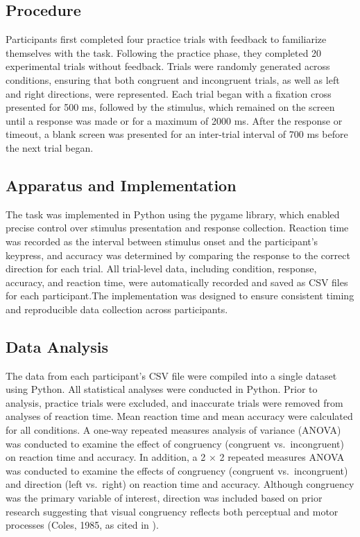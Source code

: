 \documentclass[
  authoryear,
  preprint]{elsarticle}
\begin{document}
\subsection{Procedure}\label{procedure}

Participants first completed four practice trials with feedback to
familiarize themselves with the task. Following the practice phase, they
completed 20 experimental trials without feedback. Trials were randomly
generated across conditions, ensuring that both congruent and
incongruent trials, as well as left and right directions, were
represented. Each trial began with a fixation cross presented for 500
ms, followed by the stimulus, which remained on the screen until a
response was made or for a maximum of 2000 ms. After the response or
timeout, a blank screen was presented for an inter-trial interval of 700
ms before the next trial began.

\subsection{Apparatus and
Implementation}\label{apparatus-and-implementation}

The task was implemented in Python using the pygame library, which
enabled precise control over stimulus presentation and response
collection. Reaction time was recorded as the interval between stimulus
onset and the participant's keypress, and accuracy was determined by
comparing the response to the correct direction for each trial. All
trial-level data, including condition, response, accuracy, and reaction
time, were automatically recorded and saved as CSV files for each
participant.The implementation was designed to ensure consistent timing
and reproducible data collection across participants.

\subsection{Data Analysis}\label{data-analysis}

The data from each participant's CSV file were compiled into a single
dataset using Python. All statistical analyses were conducted in Python.
Prior to analysis, practice trials were excluded, and inaccurate trials
were removed from analyses of reaction time. Mean reaction time and mean
accuracy were calculated for all conditions. A one-way repeated measures
analysis of variance (ANOVA) was conducted to examine the effect of
congruency (congruent vs.~incongruent) on reaction time and accuracy. In
addition, a 2 × 2 repeated measures ANOVA was conducted to examine the
effects of congruency (congruent vs.~incongruent) and direction (left
vs.~right) on reaction time and accuracy. Although congruency was the
primary variable of interest, direction was included based on prior
research suggesting that visual congruency reflects both perceptual and
motor processes (Coles, 1985, as cited in \citet{stoffels1988}).
\end{document}
